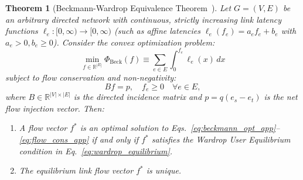 \documentclass[11pt,a4paper]{article}
\newtheorem{theorem}{Theorem}
\begin{document}
\begin{theorem}[Beckmann-Wardrop Equivalence Theorem~\cite{beckmann1956studies}]
\label{thm:beckmann_wardrop_equivalence}
Let $G = (V, E)$ be an arbitrary directed network with continuous, strictly increasing link latency functions $\ell_e: [0, \infty) \to [0, \infty)$ (such as affine latencies $\ell_e(f_e) = a_e f_e + b_e$ with $a_e > 0, b_e \ge 0$). Consider the convex optimization problem:
\begin{equation}
\label{eq:beckmann_opt_app}
\min_{f \in \mathbb{R}^{|E|}} \Phi_{\text{Beck}}(f) \equiv \sum_{e \in E} \int_0^{f_e} \ell_e(x) \, dx
\end{equation}
subject to flow conservation and non-negativity:
\begin{equation}
\label{eq:flow_cons_app}
B f = p, \quad f_e \ge 0 \quad \forall e \in E,
\end{equation}
where $B \in \mathbb{R}^{|V| \times |E|}$ is the directed incidence matrix and $p = q(e_s - e_t)$ is the net flow injection vector. Then:
\begin{enumerate}
    \item A flow vector $f^*$ is an optimal solution to Eqs.~\eqref{eq:beckmann_opt_app}--\eqref{eq:flow_cons_app} if and only if $f^*$ satisfies the Wardrop User Equilibrium condition in Eq.~\eqref{eq:wardrop_equilibrium}.
    \item The equilibrium link flow vector $f^*$ is unique.
\end{enumerate}
\end{theorem}
\end{document}

